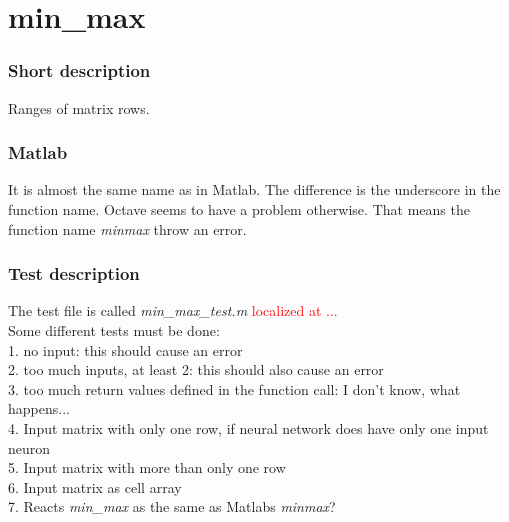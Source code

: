 \section{min\_max}
\subsubsection{Short description}
Ranges of matrix rows.\\

\subsubsection{Matlab}
It is almost the same name as in Matlab. The difference is the underscore in the function name. Octave seems to have a problem otherwise. That means the function name \textit{minmax} throw an error.

\subsubsection{Test description}
The test file is called \textit{min\_max\_test.m} \textcolor{red}{localized at ...}\\
Some different tests must be done:\\
1. no input: this should cause an error\\
2. too much inputs, at least 2: this should also cause an error\\
3. too much return values defined in the function call: I don't know, what happens...\\
4. Input matrix with only one row, if neural network does have only one input neuron\\
5. Input matrix with more than only one row\\
6. Input matrix as cell array\\
7. Reacts \textit{min\_max} as the same as Matlabs \textit{minmax}?\\

